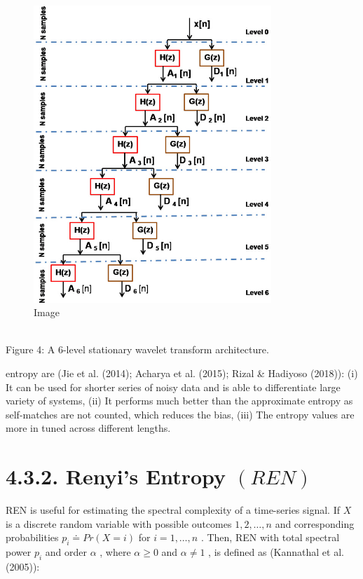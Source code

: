 \documentclass{article}
\begin{document}
\begin{figure}[htbp]
\centering
\includegraphics[width=0.8\textwidth]{images/bdc0ca10bcfc62f524c3777c4b29c1e9cf0fd8c2601ee9fd91c8da1eef1be617.jpg}
\caption{Image}
\end{figure}

\\
Figure 4: A 6-level stationary wavelet transform architecture.


entropy are (Jie et al. (2014); Acharya et al. (2015); Rizal & Hadiyoso (2018)): (i) It can be used for shorter series of noisy data and is able to differentiate large variety of systems, (ii) It performs much better than the approximate entropy as self-matches are not counted, which reduces the bias, (iii) The entropy values are more in tuned across different lengths.


\section{4.3.2. Renyi’s Entropy $(R E N)$}

REN is useful for estimating the spectral complexity of a time-series signal. If $X$ is a discrete random variable with possible outcomes $1,2,\ldots,n$ and corresponding probabilities $p_{i}\doteq P r(X=i)$ for $i=1,\ldots,n$ . Then, REN with total spectral power $p_{i}$ and order $\alpha$ , where $\alpha\geq0$ and $\alpha\neq1$ , is defined as (Kannathal et al. (2005)):
\end{document}
